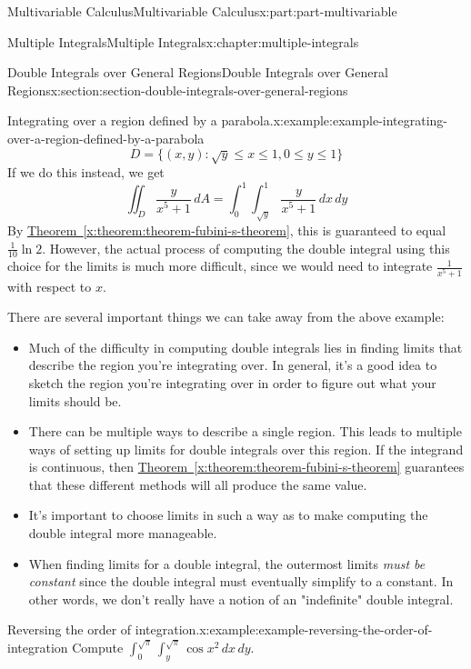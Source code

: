 \documentclass[twoside,10pt,]{book}
\newcommand{\xreffont}{\relax}
\numberwithin{equation}{part}
\begin{document}
\begin{partptx}{Multivariable Calculus}{}{Multivariable Calculus}{}{}{x:part:part-multivariable}
\begin{chapterptx}{Multiple Integrals}{}{Multiple Integrals}{}{}{x:chapter:multiple-integrals}
\begin{sectionptx}{Double Integrals over General Regions}{}{Double Integrals over General Regions}{}{}{x:section:section-double-integrals-over-general-regions}
\begin{example}{Integrating over a region defined by a parabola.}{x:example:example-integrating-over-a-region-defined-by-a-parabola}
\begin{equation*}
D = \{(x,y) : \sqrt{y} \leq x\leq 1, 0\leq y\leq 1\}
\end{equation*}
If we do this instead, we get%
\begin{equation*}
\iint_{D}\frac{y}{x^{5}+1}\,dA = \int_{0}^{1}\int_{\sqrt{y}}^{1}\frac{y}{x^{5}+1}\,dx\,dy 
\end{equation*}
By \hyperref[x:theorem:theorem-fubini-s-theorem]{Theorem~{\xreffont\ref{x:theorem:theorem-fubini-s-theorem}}}, this is guaranteed to equal \(\frac{1}{10}\ln2\). However, the actual process of computing the double integral using this choice for the limits is much more difficult, since we would need to integrate \(\frac{1}{x^{5}+1}\) with respect to \(x\).%
\end{example}
There are several important things we can take away from the above example:%
\begin{itemize}[label=\textbullet]
\item{}Much of the difficulty in computing double integrals lies in finding limits that describe the region you're integrating over. In general, it's a good idea to sketch the region you're integrating over in order to figure out what your limits should be.%
\item{}There can be multiple ways to describe a single region. This leads to multiple ways of setting up limits for double integrals over this region. If the integrand is continuous, then \hyperref[x:theorem:theorem-fubini-s-theorem]{Theorem~{\xreffont\ref{x:theorem:theorem-fubini-s-theorem}}} guarantees that these different methods will all produce the same value.%
\item{}It's important to choose limits in such a way as to make computing the double integral more manageable.%
\item{}When finding limits for a double integral, the outermost limits \emph{must be constant} since the double integral must eventually simplify to a constant. In other words, we don't really have a notion of an "indefinite" double integral.%
\end{itemize}
%
\begin{example}{Reversing the order of integration.}{x:example:example-reversing-the-order-of-integration}%
Compute \(\int_{0}^{\sqrt{\pi}}\int_{y}^{\sqrt{\pi}}\cos x^{2}\,dx\,dy\).%
\par\smallskip%

\end{example}
\end{sectionptx}
\end{chapterptx}
\end{partptx}
\end{document}
